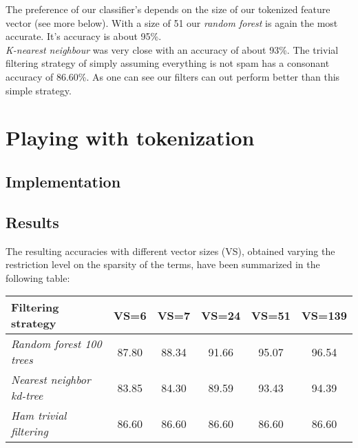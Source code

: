 \documentclass[12pt,a4paper]{article}
\begin{document}
\begin{singlespace}
The preference of our classifier's depends on the size of our tokenized feature vector (see more below). With a size of 51 our \emph{random forest} is again the most accurate. It's accuracy is about 95\%. \\

\emph{K-nearest neighbour} was very close with an accuracy of about 93\%. The trivial filtering strategy of simply assuming everything is not spam has a consonant accuracy of 86.60\%. As one can see our filters can out perform better than this simple strategy. 

\newpage
\section{Playing with tokenization}
\subsection{Implementation}

\subsection{Results}

The resulting accuracies with different vector sizes (VS), obtained varying the restriction level on the sparsity of the terms, have been summarized in the following table:

\begin{center}
    \begin{tabular}{ | l | c | c | c | c | c |}
    \hline
    \textbf{Filtering strategy}  & \textbf{VS=6} & \textbf{VS=7} & \textbf{VS=24} & \textbf{VS=51} & \textbf{VS=139}  \\ \hline \hline
    \emph{Random forest 100 trees} & 87.80 & 88.34 & 91.66 & 95.07 & 96.54   \\ \hline
    \emph{Nearest neighbor kd-tree} & 83.85 & 84.30 & 89.59 & 93.43 & 94.39  \\ \hline
    \emph{Ham trivial filtering} & 86.60 & 86.60 & 86.60 & 86.60 & 86.60 \\ \hline
    \end{tabular}
\end{center}


\end{singlespace}
\end{document}
